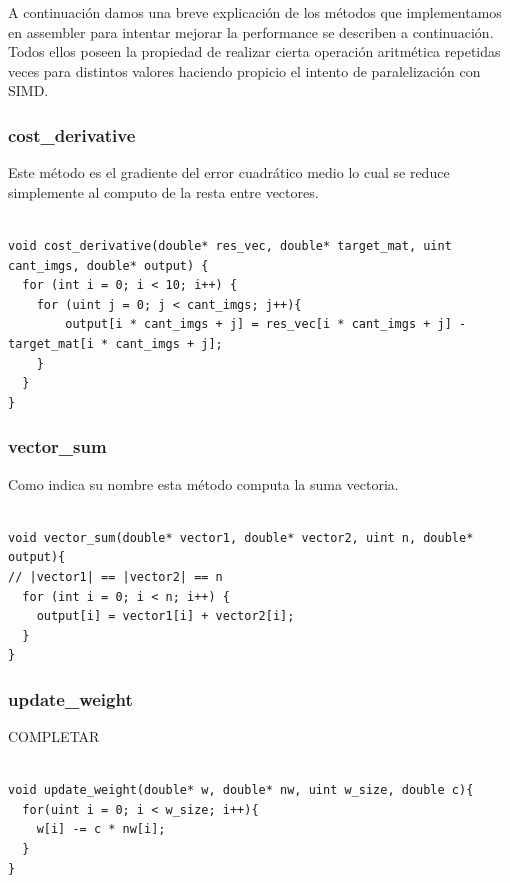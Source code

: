 A continuación damos una breve explicación de los métodos que implementamos en assembler para intentar mejorar la performance se describen a continuación. Todos ellos poseen la propiedad de realizar cierta operación aritmética repetidas veces para distintos valores haciendo propicio el intento de paralelización con SIMD.

\subsubsection{cost\_derivative}

Este método es el gradiente del error cuadrático medio lo cual se reduce simplemente al computo de la resta entre vectores.
\\
\\
\begin{lstlisting}
void cost_derivative(double* res_vec, double* target_mat, uint cant_imgs, double* output) {
  for (int i = 0; i < 10; i++) {
    for (uint j = 0; j < cant_imgs; j++){
        output[i * cant_imgs + j] = res_vec[i * cant_imgs + j] - target_mat[i * cant_imgs + j];
    }
  }
}
\end{lstlisting}

\subsubsection{vector\_sum}

Como indica su nombre esta método computa la suma vectoria.
\\
\\
\begin{lstlisting}[frame=single]
void vector_sum(double* vector1, double* vector2, uint n, double* output){
// |vector1| == |vector2| == n
  for (int i = 0; i < n; i++) {
    output[i] = vector1[i] + vector2[i];
  }
}
\end{lstlisting}


\subsubsection{update\_weight}

COMPLETAR
\\
\\
\begin{lstlisting}[frame=single]
void update_weight(double* w, double* nw, uint w_size, double c){
  for(uint i = 0; i < w_size; i++){
    w[i] -= c * nw[i];
  }
}
\end{lstlisting}

